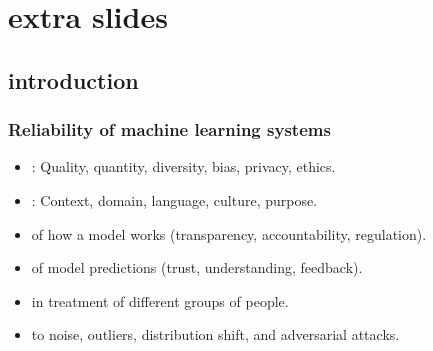
\section[Extra Slides]{extra slides}


\subsection[Introduction]{introduction}


\begin{frame}
    \frametitle{Reliability of machine learning systems}
    \begin{itemize}
        \item <1-> : Quality, quantity, diversity, bias, privacy, ethics.
        \item <1-> : Context, domain, language, culture, purpose.
        \vspace{1em}
        \item <2->  of how a model works (transparency, accountability, regulation).
        \item <2->  of model predictions (trust, understanding, feedback).
        \item <2->  in treatment of different groups of people.
        \item <2->  to noise, outliers, distribution shift, and adversarial attacks.
    \end{itemize}

\end{frame}




